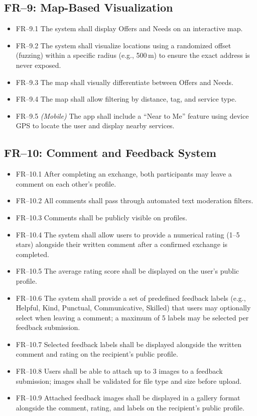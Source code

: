 \documentclass[11pt,a4paper]{report}
\begin{document}
\subsection{FR--9: Map-Based Visualization}
\begin{itemize}
    \item FR--9.1 The system shall display Offers and Needs on an interactive map.
    \item FR--9.2 The system shall visualize locations using a randomized offset (fuzzing) within a specific radius (e.g., 500\,m) to ensure the exact address is never exposed.
    \item FR--9.3 The map shall visually differentiate between Offers and Needs.
    \item FR--9.4 The map shall allow filtering by distance, tag, and service type.
    \item FR--9.5 \textit{(Mobile)} The app shall include a ``Near to Me'' feature using device GPS to locate the user and display nearby services.
\end{itemize}

\subsection{FR--10: Comment and Feedback System}
\begin{itemize}
    \item FR--10.1 After completing an exchange, both participants may leave a comment on each other's profile.
    \item FR--10.2 All comments shall pass through automated text moderation filters.
    \item FR--10.3 Comments shall be publicly visible on profiles.
    \item FR--10.4 The system shall allow users to provide a numerical rating (1--5 stars) alongside their written comment after a confirmed exchange is completed.
    \item FR--10.5 The average rating score shall be displayed on the user's public profile.
    \item FR--10.6 The system shall provide a set of predefined feedback labels (e.g., Helpful, Kind, Punctual, Communicative, Skilled) that users may optionally select when leaving a comment; a maximum of 5 labels may be selected per feedback submission.
    \item FR--10.7 Selected feedback labels shall be displayed alongside the written comment and rating on the recipient's public profile.
    \item FR--10.8 Users shall be able to attach up to 3 images to a feedback submission; images shall be validated for file type and size before upload.
    \item FR--10.9 Attached feedback images shall be displayed in a gallery format alongside the comment, rating, and labels on the recipient's public profile.
\end{itemize}
\end{document}
